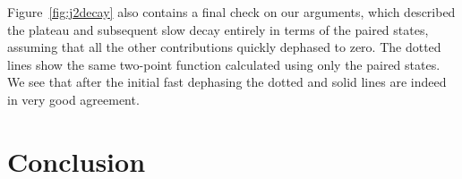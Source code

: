 \documentclass [a4paper, 11pt]{article}
\begin{document}
Figure~\ref{fig:j2decay} also contains a final check on our arguments, which described the plateau and subsequent slow decay entirely in terms of the paired states, assuming that all the other contributions quickly dephased to zero. The dotted lines show the same two-point function calculated using only the paired states. We see that after the initial fast dephasing the dotted and solid lines are indeed in very good agreement.

\section{Conclusion}







 
\end{document}
